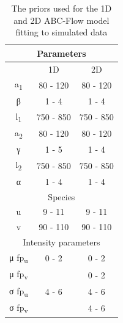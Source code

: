 \begin{table}[tb]
\centering
\caption{The priors used for the 1D and 2D ABC-Flow model fitting to simulated data}
\label{tab:priors_model}

\begin{tabular}{@{}ccc@{}}
\toprule
\multicolumn{3}{c}{Parameters}                                         \\ \midrule
\multicolumn{1}{c}{} & \multicolumn{1}{c}{1D} & \multicolumn{1}{c}{2D} \\ \midrule
a\textsubscript{1}                   & 80 - 120               & 80 - 120               \\
β                   & 1 - 4                  & 1 - 4                  \\
l\textsubscript{1}                  & 750 - 850              & 750 - 850              \\
a\textsubscript{2}                  & 80 - 120               & 80 - 120               \\
γ                   & 1 - 5                  & 1 - 4                  \\
l\textsubscript{2}                   & 750 - 850              & 750 - 850              \\
α                   & 1 - 4                  & 1 - 4                  \\ \midrule
\multicolumn{3}{c}{Species}                                            \\ \midrule
u                    & 9 - 11                 & 9 - 11                 \\
v                    & 90 - 110               & 90 - 110               \\ \midrule
\multicolumn{3}{c}{Intensity parameters}                               \\ \midrule
μ fp\textsubscript{u}             & 0 - 2                  & 0 - 2                  \\
μ fp\textsubscript{v}             &                   & 0 - 2                  \\
σ fp\textsubscript{u}            & 4 - 6                  & 4 - 6                  \\
σ fp\textsubscript{v}            &                   & 4 - 6                  \\ \bottomrule
\end{tabular}

\end{table}




